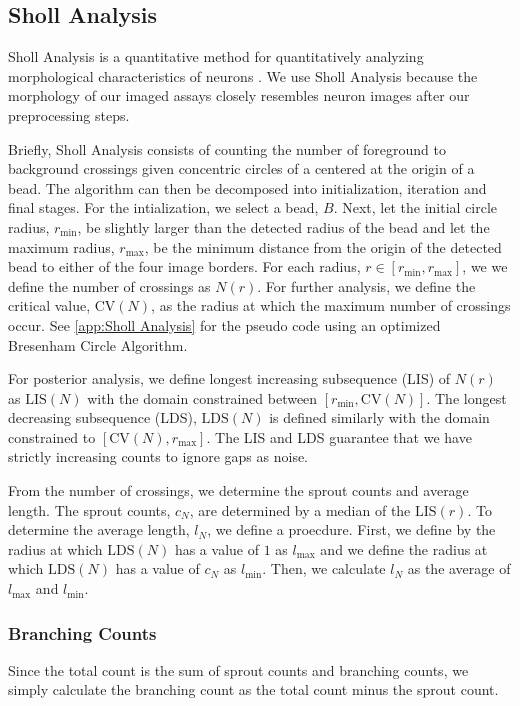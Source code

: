 \documentclass{sig-alternate}
\begin{document}

	\subsection{Sholl Analysis} %
	\label{sub:Sholl Analysis}
		Sholl Analysis is a quantitative method for quantitatively
		analyzing morphological characteristics of neurons \cite{sholl53}.
		We use Sholl Analysis because the morphology of our imaged assays
		closely resembles neuron images after our preprocessing steps.

		Briefly, Sholl Analysis consists of counting the number of
		foreground to background crossings given concentric circles of a
		centered at the origin of a bead. The algorithm can then be
		decomposed into initialization, iteration and final stages. For
		the intialization, we select a bead, $B$. Next, let the initial
		circle radius, $r_{\min}$, be slightly larger than the detected
		radius of the bead and let the maximum radius, $r_{\max}$, be the
		minimum distance from the origin of the detected bead to either of
		the four image borders. For each radius, $r \in [r_{\min},
		r_{\max}]$, we we define the number of crossings as $N(r)$. For further analysis,
		we define the critical value, $\text{CV}(N)$, as the radius at which
		the maximum number of crossings occur. See \ref{app:Sholl
		Analysis} for the pseudo code using an optimized Bresenham Circle
		Algorithm.
		
		For posterior analysis, we define longest increasing subsequence
		(LIS) of $N(r)$ as $\text{LIS}(N)$ with the domain constrained
		between $[r_{\min}, \text{CV}(N)]$. The longest decreasing
		subsequence (LDS), $\text{LDS}(N)$ is defined similarly with the
		domain constrained to $[\text{CV}(N), r_{\max}]$. The LIS and LDS
		guarantee that we have strictly increasing counts to ignore gaps
		as noise.

		From the number of crossings, we determine the sprout counts and
		average length. The sprout counts, $c_N$, are determined by a
		median of the $\text{LIS}(r)$. To determine the average length,
		$l_N$, we define a proecdure. First, we define by the radius at
		which $\text{LDS}(N)$ has a value of $1$ as $l_{\max}$ and we
		define the radius at which $\text{LDS}(N)$ has a value of
		$c_N$ as $l_{\min}$. Then, we calculate $l_N$ as the average
		of $l_{\max}$ and $l_{\min}$.

		\subsubsection{Branching Counts} %
		\label{ssub:Branching Counts}
			Since the total count is the sum of sprout counts and branching
			counts, we simply calculate the branching count as the total
			count minus the sprout count.
\end{document}
